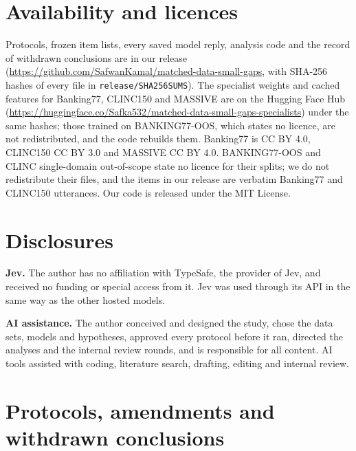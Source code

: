 \documentclass[11pt]{article}
\begin{document}
\section*{Availability and licences}
Protocols, frozen item lists, every saved model reply, analysis code and the record of withdrawn conclusions are in our release (\url{https://github.com/SafwanKamal/matched-data-small-gaps}, with SHA-256 hashes of every file in \texttt{release/SHA256SUMS}). The specialist weights and cached features for Banking77, CLINC150 and MASSIVE are on the Hugging Face Hub (\url{https://huggingface.co/Safka532/matched-data-small-gaps-specialists}) under the same hashes; those trained on BANKING77-OOS, which states no licence, are not redistributed, and the code rebuilds them.
Banking77 is CC BY 4.0, CLINC150 CC BY 3.0 and MASSIVE CC BY 4.0. BANKING77-OOS and CLINC single-domain out-of-scope \citep{zhang2022oos} state no licence for their splits; we do not redistribute their files, and the items in our release are verbatim Banking77 and CLINC150 utterances. Our code is released under the MIT License.

\section*{Disclosures}
\textbf{Jev.} The author has no affiliation with TypeSafe, the provider of Jev, and received no funding or special access from it. Jev was used through its API in the same way as the other hosted models.

\textbf{AI assistance.} The author conceived and designed the study, chose the data sets, models and hypotheses, approved every protocol before it ran, directed the analyses and the internal review rounds, and is responsible for all content. AI tools assisted with coding, literature search, drafting, editing and internal review.



\appendix

\section{Protocols, amendments and withdrawn conclusions}
\label{app:record}
\end{document}

